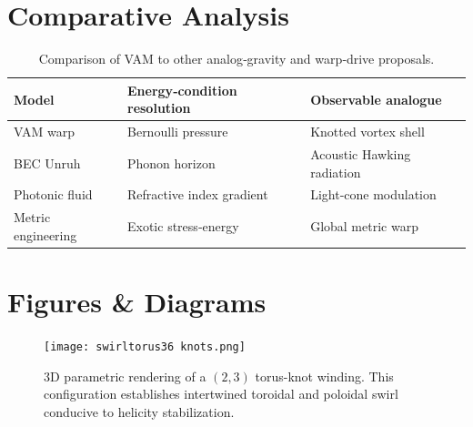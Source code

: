 \documentclass[preprint,notitlepage]{revtex4-2}
\begin{document}
\section{Comparative Analysis}
    \begin{table}[H]
    \centering
    \renewcommand{\arraystretch}{1.2}
    \begin{tabular}{|l|l|l|}
    \hline
    Model & Energy‐condition resolution & Observable analogue \\
    \hline
    VAM warp & Bernoulli pressure & Knotted vortex shell \\
    BEC Unruh & Phonon horizon & Acoustic Hawking radiation \\
    Photonic fluid & Refractive index gradient & Light‐cone modulation \\
    Metric engineering & Exotic stress‐energy & Global metric warp \\
    \hline
    \end{tabular}
    \caption{Comparison of VAM to other analog‐gravity and warp‐drive proposals.}
    \end{table}

\section{Figures \& Diagrams}
\begin{figure}[H]
  \centering
  \texttt{[image: swirltorus36 knots.png]}
  \caption{3D parametric rendering of a $(2,3)$ torus-knot winding. This configuration establishes intertwined toroidal and poloidal swirl conducive to helicity stabilization.}
  \label{fig:torus36}
\end{figure}
\end{document}
